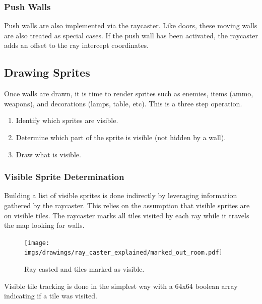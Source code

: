 \subsubsection{Push Walls} 
Push walls are also implemented via the raycaster. Like doors, these moving walls are also treated as special cases. If the push wall has been activated, the raycaster adds an offset to the ray intercept coordinates.

















\subsection{Drawing Sprites}
\label{drawingSprites}
Once walls are drawn, it is time to render sprites such as enemies, items (ammo, weapons), and decorations (lamps, table, etc). This is a three step operation.
 \begin{enumerate}
  \item Identify which sprites are visible.
  \item Determine which part of the sprite is visible (not hidden by a wall).
  \item Draw what is visible.
 \end{enumerate}



\subsubsection{Visible Sprite Determination}
Building a list of visible sprites is done indirectly by leveraging information gathered by the raycaster. This relies on the assumption that visible sprites are on visible tiles. The raycaster marks all tiles visited by each ray while it travels the map looking for walls.\\
\begin{figure}[H]
  \centering
  \texttt{[image: imgs/drawings/ray\_caster\_explained/marked\_out\_room.pdf]}
 \caption{Ray casted and tiles marked as visible.} 
\end{figure}
Visible tile tracking is done in the simplest way with a 64x64 boolean array indicating if a tile was visited.\\
\par
\par
\begin{minipage}{\textwidth}
  
\end{minipage}
\par

